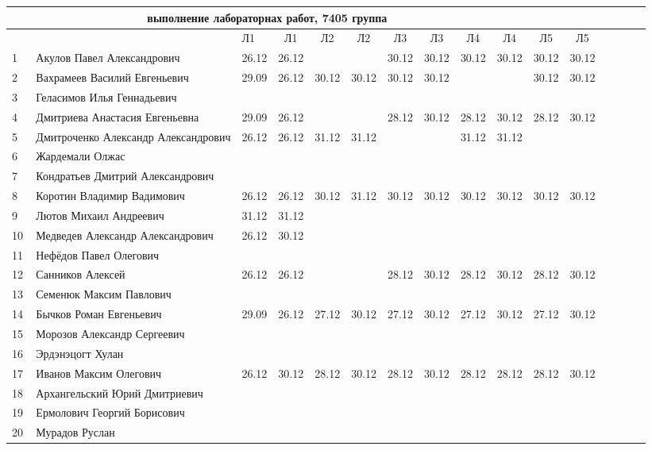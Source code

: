 \documentclass[a4paper,landscape,11pt]{article}
\begin{document}
\newpage
%
\hspace{-4.1cm} %
\begin{tabular}{l|llccccccccccccc}
\multicolumn{10}{c}{выполнение лабораторнах работ, 7405 группа} \\
\toprule
&&Л1&Л1& Л2&Л2& Л3&Л3& Л4&Л4&Л5&Л5\\
\midrule
1\,& Акулов Павел Александрович            &26.12& 26.12&      &      & 30.12& 30.12& 30.12& 30.12& 30.12& 30.12\\
2\,& Вахрамеев Василий Евгеньевич          &29.09& 26.12& 30.12& 30.12& 30.12& 30.12&      &      & 30.12& 30.12\\
3\,& Геласимов Илья Геннадьевич            &&&&&&&&\\
4\,& Дмитриева Анастасия Евгеньевна        &29.09& 26.12&      &      & 28.12& 30.12& 28.12& 30.12& 28.12& 30.12\\
5\,& Дмитроченко Александр Александрович   &26.12& 26.12& 31.12& 31.12&      &      &  31.12& 31.12\\
\midrule
6\,& Жардемали Олжас   &&&&&&&&\\
7\,& Кондратьев Дмитрий Александрович      &&&&&&&&\\
8\,& Коротин Владимир Вадимович            &26.12& 26.12& 30.12& 31.12& 30.12& 30.12& 30.12& 30.12& 30.12& 30.12\\
9\,& Лютов Михаил Андреевич                &31.12&31.12&&&&&&\\
10\,&Медведев Александр Александрович      &26.12& 30.12&&&&&&\\
\midrule
11\,&Нефёдов Павел Олегович                &&&&&&&&\\
12\,&Санников Алексей                      &26.12& 26.12&      &      & 28.12& 30.12& 28.12& 30.12& 28.12& 30.12\\
13\,&Семенюк Максим Павлович               &&&&&&&&\\
14\,&Бычков Роман Евгеньевич               &29.09& 26.12& 27.12& 30.12& 27.12& 30.12& 27.12& 30.12& 27.12& 30.12\\
15\,&Морозов Александр Сергеевич           &&&&&&&&\\
\midrule
16\,&Эрдэнэцогт Хулан                      &&&&&&&&\\
17\,&Иванов Максим Олегович                &26.12& 30.12& 28.12& 30.12& 28.12& 30.12& 28.12& 28.12& 28.12& 30.12\\
18\,&Архангельский Юрий Дмитриевич         &&&&&&&&\\ 
19\,&Ермолович Георгий Борисович           &&&&&&&&\\
20\,& Мурадов Руслан                       &&&&&&&&\\
\bottomrule
\end{tabular}
\end{document}
